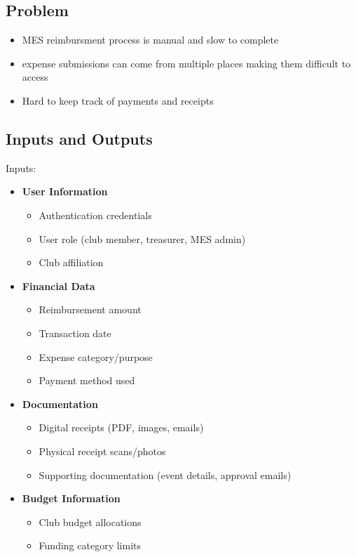 \documentclass{article}
\begin{document}
\subsection{Problem}
\begin{itemize}
    \item MES reimbursment process is manual and slow to complete
    \item expense submissions can come from multiple places making them difficult to access
    \item Hard to keep track of payments and receipts
  \end{itemize}

\subsection{Inputs and Outputs}
Inputs: 
\begin{itemize}
  \item \textbf{User Information}
    \begin{itemize}
      \item Authentication credentials
      \item User role (club member, treasurer, MES admin)
      \item Club affiliation
    \end{itemize}
  \item \textbf{Financial Data}
    \begin{itemize}
      \item Reimbursement amount
      \item Transaction date
      \item Expense category/purpose
      \item Payment method used
    \end{itemize}
  \item \textbf{Documentation}
    \begin{itemize}
      \item Digital receipts (PDF, images, emails)
      \item Physical receipt scans/photos
      \item Supporting documentation (event details, approval emails)
    \end{itemize}
  \item \textbf{Budget Information}
    \begin{itemize}
      \item Club budget allocations
      \item Funding category limits
    \end{itemize}
\end{itemize}
\end{document}
